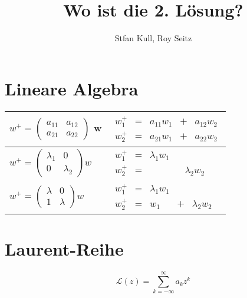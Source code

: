 \documentclass[]{article}
\author{Stfan Kull, Roy Seitz}
\title{Wo ist die 2. Lösung?}
\begin{document}
	
\maketitle{}

\huge{
\section{Lineare Algebra}
\begin{tabular}{|l|l|}
	\hline
	$w^+=\begin{pmatrix}
	a_{11} & a_{12} \\ a_{21} & a_{22}
	\end{pmatrix}$ w&
	$\begin{matrix}
		w_1^{+}&=&a_{11}w_1&+&a_{12}w_2\\			w_2^{+}&=&a_{21}w_1&+&a_{22}w_2
	\end{matrix}$ \\ 
	
	\hline
	$w^+=\begin{pmatrix}
		\lambda_1 & 0 \\ 0 & \lambda_2
	\end{pmatrix}w $&
	
	$\begin{matrix}
		w_1^{+}&=&\lambda_1w_1&\\
		w_2^{+}&=&&&\lambda_2w_2
	\end{matrix}$ \\
	
	\hline	 
	$w^+=\begin{pmatrix}
	\lambda & 0 \\ 1 & \lambda
	\end{pmatrix}w$&
	
	$\begin{matrix}
		w_1^{+}&=&\lambda_1w_1&\\
		w_2^{+}&=&w_1&+&\lambda_2w_2
	\end{matrix}$\\
	\hline
\end{tabular}

\section{Laurent-Reihe}
$$\mathcal{L}(z)=\sum_{k=-\infty}^{\infty}a_kz^k $$
}
\end{document}
